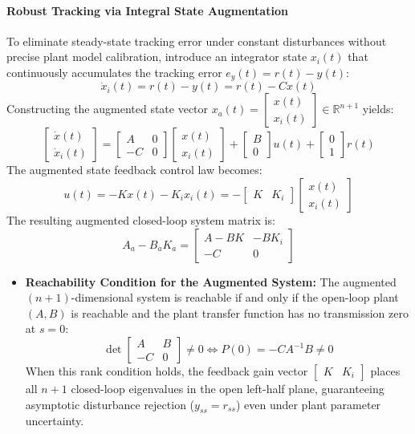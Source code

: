 \documentclass[12pt,onecolumn,twoside ]{article}
\begin{document}
	\paragraph{Robust Tracking via Integral State Augmentation}
	To eliminate steady-state tracking error under constant disturbances without precise plant model calibration, introduce an integrator state $x_i(t)$ that continuously accumulates the tracking error $e_y(t) = r(t) - y(t)$: \[
	\dot{x}_i(t) = r(t) - y(t) = r(t) - Cx(t)
	\]
	Constructing the augmented state vector $x_a(t) = \begin{bmatrix} x(t) \\ x_i(t) \end{bmatrix} \in \mathbb{R}^{n+1}$ yields: \[
	\begin{bmatrix} \dot{x}(t) \\ \dot{x}_i(t) \end{bmatrix} = \begin{bmatrix} A & 0 \\ -C & 0 \end{bmatrix} \begin{bmatrix} x(t) \\ x_i(t) \end{bmatrix} + \begin{bmatrix} B \\ 0 \end{bmatrix} u(t) + \begin{bmatrix} 0 \\ 1 \end{bmatrix} r(t)
	\]
	The augmented state feedback control law becomes: \[
	u(t) = -Kx(t) - K_i x_i(t) = -\begin{bmatrix} K & K_i \end{bmatrix} \begin{bmatrix} x(t) \\ x_i(t) \end{bmatrix}
	\]
	The resulting augmented closed-loop system matrix is: \[
	A_a - B_a K_a = \begin{bmatrix} A - BK & -B K_i \\ -C & 0 \end{bmatrix}
	\]
	\begin{itemize}
		\item
		\textbf{Reachability Condition for the Augmented System:} The augmented $(n+1)$-dimensional system is reachable if and only if the open-loop plant $(A, B)$ is reachable and the plant transfer function has no transmission zero at $s = 0$: \[
		\det \begin{bmatrix} A & B \\ -C & 0 \end{bmatrix} \neq 0 \iff P(0) = -CA^{-1}B \neq 0
		\] When this rank condition holds, the feedback gain vector $\begin{bmatrix} K & K_i \end{bmatrix}$ places all $n+1$ closed-loop eigenvalues in the open left-half plane, guaranteeing asymptotic disturbance rejection ($y_{ss} = r_{ss}$) even under plant parameter uncertainty.
	\end{itemize}
	
\end{document}
